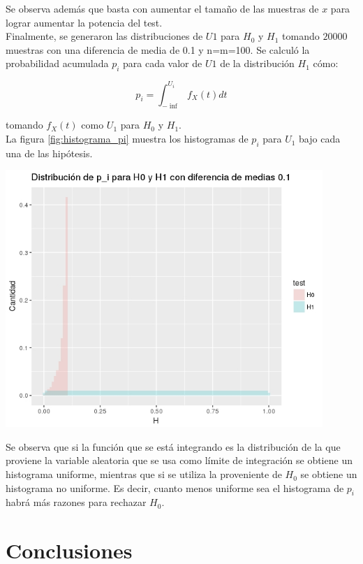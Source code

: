 \documentclass[%
 reprint,
 amsmath,amssymb,
 aps,
spanish]{revtex4-1}
\begin{document}
Se observa además que basta con aumentar el tamaño de las muestras de $x$ para lograr aumentar la potencia del test.\\
Finalmente, se generaron las distribuciones de $U1$ para $H_0$ y $H_1$ tomando $20000$ muestras con una diferencia de media de 0.1 y n=m=100. Se calculó la probabilidad acumulada $p_i$ para cada 
valor de $U1$ de la distribución $H_1$ cómo:

\begin{equation}
p_i=\int_{-\inf}^{U_i} f_X(t) dt
\label{pi}
\end{equation}

tomando $f_X(t)$ como $U_1$ para $H_0$ y $H_1$. \\
La figura \ref{fig:histograma_pi} muestra los histogramas de $p_i$ para $U_1$ bajo cada una de las hipótesis. 

\begin{minipage}{0.45\textwidth}									
\centering
\includegraphics[width=0.9\textwidth]{imagenes/histograma_pi}
    \label{fig:histograma_pi}
\end{minipage}

Se observa que si la función que se está integrando es la distribución de la que proviene la variable aleatoria que se usa como límite de integración se obtiene un histograma uniforme, mientras que si 
se utiliza la proveniente de $H_0$ se obtiene un histograma no uniforme. Es decir, cuanto menos uniforme sea el histograma de $p_i$ habrá más razones para rechazar $H_0$.

\section{Conclusiones}
\end{document}

